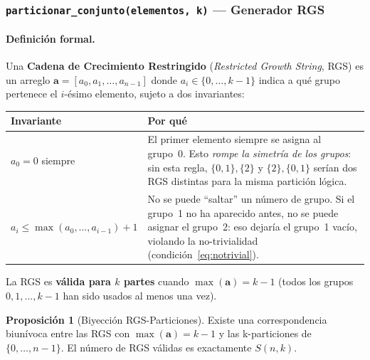 \documentclass[12pt,letterpaper]{article}
\theoremstyle{definition}
\newtheorem{proposition}{Proposición}[section]
\theoremstyle{remark}
\newcommand{\Stir}[2]{S(#1,#2)}
\begin{document}
\subsubsection{\texttt{particionar\_conjunto(elementos, k)} --- Generador RGS}

\paragraph{Definición formal.}
Una \textbf{Cadena de Crecimiento Restringido} (\emph{Restricted Growth String}, RGS)
es un arreglo $\mathbf{a} = [a_0, a_1, \ldots, a_{n-1}]$ donde $a_i \in \{0,\ldots,k-1\}$
indica a qué grupo pertenece el $i$-ésimo elemento, sujeto a dos invariantes:

\begin{center}
\begin{tabular}{@{}l p{9cm}@{}}
\toprule
\textbf{Invariante} & \textbf{Por qué} \\
\midrule
$a_0 = 0$ siempre &
  El primer elemento siempre se asigna al grupo~0.
  Esto \emph{rompe la simetría de los grupos}: sin esta regla,
  $\{0{,}1\},\{2\}$ y $\{2\},\{0{,}1\}$ serían dos RGS distintas
  para la misma partición lógica. \\[4pt]
$a_i \leq \max(a_0,\ldots,a_{i-1}) + 1$ &
  No se puede ``saltar'' un número de grupo. Si el grupo~1 no ha
  aparecido antes, no se puede asignar el grupo~2: eso dejaría
  el grupo~1 vacío, violando la no-trivialidad
  (condición~\ref{eq:notrivial}). \\
\bottomrule
\end{tabular}
\end{center}

La RGS es \textbf{válida para $k$ partes} cuando $\max(\mathbf{a}) = k-1$
(todos los grupos $0, 1, \ldots, k-1$ han sido usados al menos una vez).

\begin{proposition}[Biyección RGS-Particiones]
Existe una correspondencia biunívoca entre las RGS con $\max(\mathbf{a}) = k-1$
y las k-particiones de $\{0, \ldots, n-1\}$.
El número de RGS válidas es exactamente $\Stir{n}{k}$.
\end{proposition}
\end{document}

